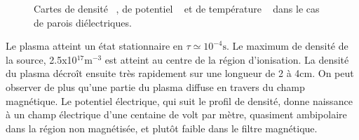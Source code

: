 \begin{refsection}
\begin{figure}[!htbp]
    \centering
    \caption{Cartes de densité ~, de potentiel
    ~ et de température
    ~ dans le cas de parois
    diélectriques.}
    \label{2-CartesWithTe}
	\end{figure}

Le plasma atteint un état stationnaire en $\tau\simeq 10^{-4}\text{s}$. Le
maximum de densité de la source, 2.5x10$^{17}\text{m}^{-3}$ est atteint au
centre de la région d'ionisation. La densité du plasma décroît ensuite très
rapidement sur une longueur de 2 à 4cm. On peut observer de plus qu'une partie
du plasma diffuse en travers du champ magnétique. Le potentiel électrique, qui
suit le profil de densité, donne naissance à un champ électrique d'une centaine
de volt par mètre, quasiment ambipolaire dans la région non magnétisée, et
plutôt faible dans le filtre magnétique.


\end{refsection}
